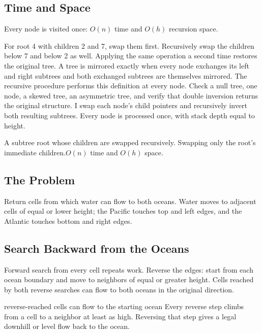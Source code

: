 \subsection{Time and Space}
Every node is visited once: \(O(n)\) time and \(O(h)\) recursion space.

\lessonexpansion
  {For root 4 with children 2 and 7, swap them first. Recursively swap the
   children below 7 and below 2 as well. Applying the same operation a second
   time restores the original tree.}
  {A tree is mirrored exactly when every node exchanges its left and right
   subtrees and both exchanged subtrees are themselves mirrored. The recursive
   procedure performs this definition at every node.}
  {Check a null tree, one node, a skewed tree, an asymmetric tree, and verify
   that double inversion returns the original structure.}
  {I swap each node's child pointers and recursively invert both resulting
   subtrees. Every node is processed once, with stack depth equal to height.}

  {A subtree root whose children are swapped recursively.}
  {Swapping only the root's immediate children.}{$O(n)$ time and $O(h)$ space.}



\subsection{The Problem}
Return cells from which water can flow to both oceans. Water moves to adjacent
cells of equal or lower height; the Pacific touches top and left edges, and
the Atlantic touches bottom and right edges.

\subsection{Search Backward from the Oceans}
Forward search from every cell repeats work. Reverse the edges: start from
each ocean boundary and move to neighbors of equal or greater height. Cells
reached by both reverse searches can flow to both oceans in the original
direction.

\begin{invariantbox}{reverse-reached cells can flow to the starting ocean}
Every reverse step climbs from a cell to a neighbor at least as high. Reversing
that step gives a legal downhill or level flow back to the ocean.
\end{invariantbox}

